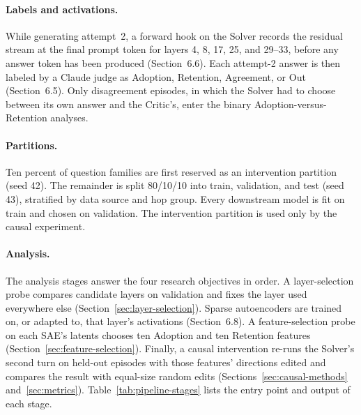 \paragraph{Labels and activations.} While generating attempt~2, a forward hook
on the Solver records the residual stream at the final prompt token for layers
4, 8, 17, 25, and 29--33, before any answer token has been produced (Section~6.6).
Each attempt-2 answer is then labeled by a Claude judge as Adoption,
Retention, Agreement, or Out (Section~6.5). Only disagreement episodes, in
which the Solver had to choose between its own answer and the Critic's,
enter the binary Adoption-versus-Retention analyses.

\paragraph{Partitions.} Ten percent of question families are first reserved
as an intervention partition (seed 42). The remainder is split 80/10/10 into
train, validation, and test (seed 43), stratified by data source and hop group.
Every downstream model is fit on train and chosen on validation. The
intervention partition is used only by the causal experiment.

\paragraph{Analysis.} The analysis stages answer the four research objectives
in order. A layer-selection probe compares candidate layers on validation and
fixes the layer used everywhere else (Section~\ref{sec:layer-selection}).
Sparse autoencoders are trained on, or adapted to, that layer's activations
(Section~6.8). A feature-selection probe on each SAE's latents chooses ten
Adoption and ten Retention features (Section~\ref{sec:feature-selection}).
Finally, a causal intervention re-runs the Solver's second turn on held-out
episodes with those features' directions edited and compares the result with
equal-size random edits (Sections~\ref{sec:causal-methods}
and~\ref{sec:metrics}). Table~\ref{tab:pipeline-stages} lists the entry point
and output of each stage.

